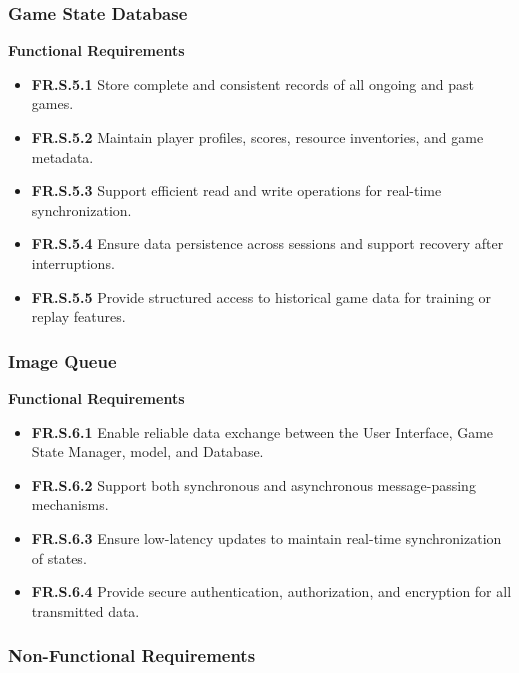 \documentclass{article}
\begin{document}
\subsubsection{Game State Database}

\textbf{Functional Requirements}

\begin{itemize}
  \item \label{FR.S.5.1}\textbf{FR.S.5.1} Store complete and consistent records of all ongoing and past \emph{\Catan{}} games.
  \item \label{FR.S.5.2}\textbf{FR.S.5.2} Maintain player profiles, scores, resource inventories, and game metadata.
  \item \label{FR.S.5.3}\textbf{FR.S.5.3} Support efficient read and write operations for real-time synchronization.
  \item \label{FR.S.5.4}\textbf{FR.S.5.4} Ensure data persistence across sessions and support recovery after interruptions.
  \item \label{FR.S.5.5}\textbf{FR.S.5.5} Provide structured access to historical game data for training or replay features.
\end{itemize}


\subsubsection{Image Queue}

\textbf{Functional Requirements}

\begin{itemize}
  \item \label{FR.S.6.1}\textbf{FR.S.6.1} Enable reliable data exchange between the User Interface, Game State Manager, \AI{} model, and Database.
  \item \label{FR.S.6.2}\textbf{FR.S.6.2} Support both synchronous and asynchronous message-passing mechanisms.
  \item \label{FR.S.6.3}\textbf{FR.S.6.3} Ensure low-latency updates to maintain real-time synchronization of states.
  \item \label{FR.S.6.4}\textbf{FR.S.6.4} Provide secure authentication, authorization, and encryption for all transmitted data.
\end{itemize}



\subsubsection{Non-Functional Requirements}
\end{document}

